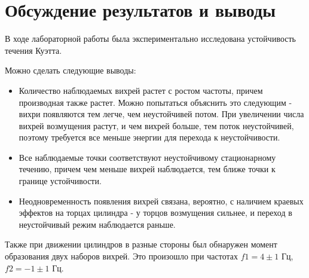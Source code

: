 \documentclass[a4paper,12pt]{article}
\begin{document}
\newpage
\section{Обсуждение результатов и выводы}
В ходе лабораторной работы была экспериментально исследована устойчивость течения Куэтта.

Можно сделать следующие выводы:
\begin{itemize}
    \item Количество наблюдаемых вихрей растет с ростом частоты, причем производная также растет. Можно попытаться объяснить это следующим - вихри появляются тем легче, чем неустойчивей потом. При увеличении числа вихрей возмущения растут, и чем вихрей больше, тем поток неустойчивей, поэтому требуется все меньше энергии для перехода к неустойчивости. 
    \item Все наблюдаемые точки соответствуют неустойчивому стационарному течению, причем чем меньше вихрей наблюдается, тем ближе точки к границе устойчивости.
    \item Неодновременность появления вихрей связана, вероятно, с наличием краевых эффектов на торцах цилиндра - у торцов возмущения сильнее, и переход в неустойчивый режим наблюдается раньше.
\end{itemize}

Также при движении цилиндров в разные стороны был обнаружен момент образования двух наборов вихрей. Это произошло при частотах $f1 = 4 \pm 1$ Гц, $f2 = -1\pm 1$ Гц. 
\end{document}
